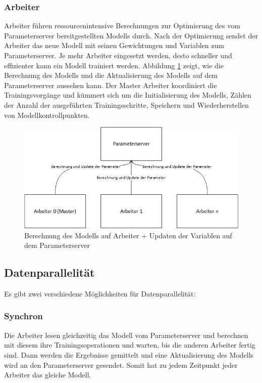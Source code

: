 \subsubsection{Arbeiter}
Arbeiter führen ressourcenintensive Berechnungen zur Optimierung des vom Parameterserver bereitgestellten Modells durch. Nach der Optimierung sendet der Arbeiter das neue Modell mit seinen Gewichtungen und Variablen zum Parameterserver. Je mehr Arbeiter eingesetzt werden, desto schneller und effizienter kann ein Modell trainiert werden. Abbildung \ref{fig:architektur-updatemodel} zeigt, wie die Berechnung des Modells und die Aktualisierung des Modells auf dem Parameterserver aussehen kann. Der Master Arbeiter koordiniert die Trainingsvorgänge und kümmert sich um die Initialisierung des Modells, Zählen der Anzahl der ausgeführten Trainingsschritte, Speichern und Wiederherstellen von Modellkontrollpunkten.

\begin{figure}[h!]
	\centering
	\includegraphics[width=1\linewidth]{Pictures/Architektur-UpdateModel}
	\caption[Berechnung des Modells auf Arbeiter + Updaten der Variablen auf dem Parameterserver]{Berechnung des Modells auf Arbeiter + Updaten der Variablen auf dem Parameterserver}
	\label{fig:architektur-updatemodel}
\end{figure}

\subsection{Datenparallelität}
Es gibt zwei verschiedene Möglichkeiten für Datenparallelität:
\subsubsection{Synchron}
Die Arbeiter lesen gleichzeitig das Modell vom Parameterserver und berechnen mit diesem ihre Trainingsoperationen und warten, bis die anderen Arbeiter fertig sind. Dann werden die Ergebnisse gemittelt und eine Aktualisierung des Modells wird an den Parameterserver gesendet. Somit hat zu jedem Zeitpunkt jeder Arbeiter das gleiche Modell.

